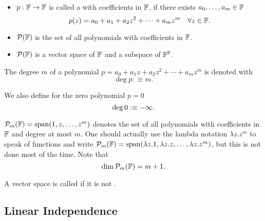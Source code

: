 \begin{mydef}
  \begin{itemize}
    \item $p: \mathbb{F} \to \mathbb{F}$ is called a  with coefficients in $\mathbb{F}$, if there exists $a_0, \ldots, a_m \in \mathbb{F}$ \st
    \begin{equation}
      p(z)=a_0 + a_1 + a_2z^2 + \cdots + a_m z^m \quad \forall z \in \mathbb{F}.
    \end{equation}
    \item $\mathcal{P} (\mathbb{F})$ is the set of all polynomials with coefficients in $\mathbb{F}$.
    \item $\mathcal{P} (\mathbb{F})$ is a vector space of $\mathbb{F}$ and a subspace of $\mathbb{F}^{\mathbb{F}}$.
  \end{itemize}
\end{mydef}

\begin{mydef}
  The degree $m$ of a polynomial $p=a_0+a_1z+a_2z^2+\cdots+a_mz^m$ is denoted with \begin{equation}
    \deg p :\equiv m.
  \end{equation}

  We also define for the zero polynomial $p=0$
  \begin{equation}
    {\operatorname{deg} \,} 0 : \equiv -\infty.
  \end{equation}
\end{mydef}

\begin{mydef} 
  $\mathcal{P}_m (\mathbb{F} )=\operatorname{span} (1,z,\dots,z^m)$ denotes the set of all polynomials with coefficients in $\mathbb{F}$ and degree at most $m$. One should actually use the lambda notation $\lambda z.z^m$ to speak of functions and write $\mathcal{P}_m (\mathbb{F} )=\operatorname{span} (\lambda z.1,\lambda z.z,\dots,\lambda z.z^m)$, but this is not done most of the time. Note that
  \begin{equation}
    \dim \mathcal{P}_m(\mathbb{F}) = m+1.
  \end{equation}
\end{mydef}

\setcounter{thm}{12}
\begin{mydef}
  A vector space is called  if it is not \fd.
\end{mydef}


\subsection{Linear Independence}

